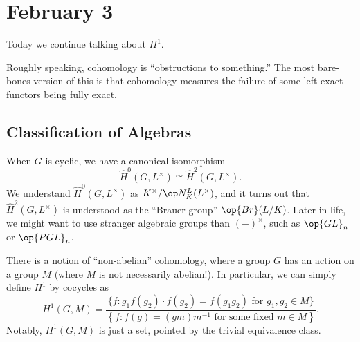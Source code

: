 \documentclass[../notes.tex]{subfiles}
\begin{document}
\section{February 3}

Today we continue talking about $H^1$.
\begin{remark}
	Roughly speaking, cohomology is ``obstructions to something.'' The most bare-bones version of this is that cohomology measures the failure of some left exact-functors being fully exact.
\end{remark}

\subsection{Classification of Algebras}
When $G$ is cyclic, we have a canonical isomorphism
\[\widehat H^0(G,L^\times)\cong\widehat H^2(G,L^\times).\]
We understand $\widehat H^0(G,L^\times)$ as $K^\times/\op N^L_K(L^\times)$, and it turns out that $\widehat H^2(G,L^\times)$ is understood as the ``Brauer group'' $\op{Br}(L/K)$. Later in life, we might want to use stranger algebraic groups than $(-)^\times$, such as $\op{GL}_n$ or $\op{PGL}_n$.

There is a notion of ``non-abelian'' cohomology, where a group $G$ has an action on a group $M$ (where $M$ is not necessarily abelian!). In particular, we can simply define $H^1$ by cocycles as
\[H^1(G,M)=\frac{\{f:g_1f(g_2)\cdot f(g_2)=f(g_1g_2)\text{ for }g_1,g_2\in M\}}{\left\{f:f(g)=(gm)m^{-1}\text{ for some fixed }m\in M\right\}}.\]
Notably, $H^1(G,M)$ is just a set, pointed by the trivial equivalence class.
\end{document}
